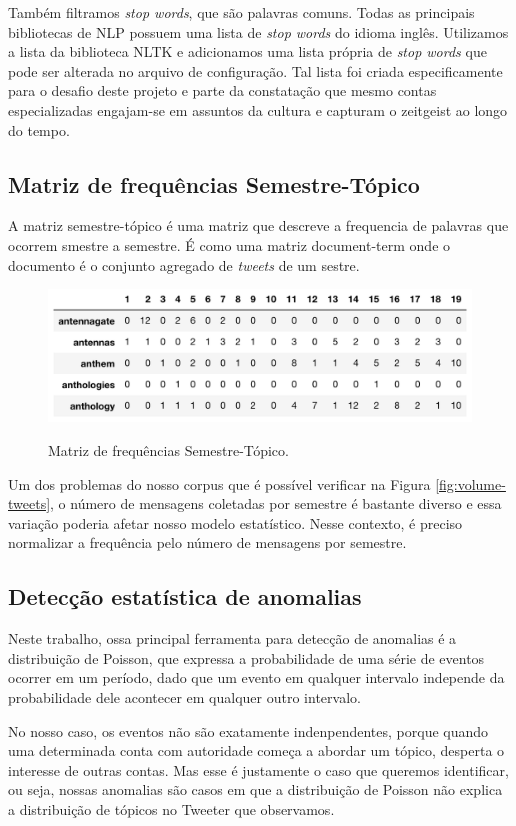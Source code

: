 \documentclass[paper=a4, fontsize=11pt]{scrartcl}
\numberwithin{equation}{section}		%
\numberwithin{figure}{section}			%
\numberwithin{table}{section}				%
\begin{document}
Também filtramos \emph{stop words}, que são palavras comuns. Todas as principais bibliotecas de NLP possuem uma lista de \emph{stop words} do idioma inglês. Utilizamos a lista da biblioteca NLTK \citep{nltk} e adicionamos uma lista própria de \emph{stop words} que pode ser alterada no arquivo de configuração. Tal lista foi criada especificamente para o desafio deste projeto e parte da constatação que mesmo contas especializadas engajam-se em assuntos da cultura e capturam o zeitgeist ao longo do tempo.

\subsection{Matriz de frequências Semestre-Tópico}
A matriz semestre-tópico é uma matriz que descreve a frequencia de palavras que ocorrem smestre a semestre. É como uma matriz document-term onde o documento é o conjunto agregado de \emph{tweets} de um sestre. 
\begin{figure}[h]
	\centering
	\caption{Matriz de frequências Semestre-Tópico.}
	\includegraphics[width=.8\columnwidth]{sem-term}
	\label{fig:sem-term}
\end{figure}
Um dos problemas do nosso corpus que é possível verificar na Figura \ref{fig:volume-tweets}, o número de mensagens coletadas por semestre é bastante diverso e essa variação poderia afetar nosso modelo estatístico. Nesse contexto, é preciso normalizar a frequência pelo número de mensagens por semestre.
\subsection{Detecção estatística de anomalias}
Neste trabalho, ossa principal ferramenta para detecção de anomalias é a distribuição de Poisson, que expressa a probabilidade de uma série de eventos ocorrer em um período, dado que um evento em qualquer intervalo independe da probabilidade dele acontecer em qualquer outro intervalo.

No nosso caso, os eventos não são exatamente indenpendentes, porque quando uma determinada conta com autoridade começa a abordar um tópico, desperta o interesse de outras contas. Mas esse é justamente o caso que queremos identificar, ou seja, nossas anomalias são casos em que a distribuição de Poisson não explica a distribuição de tópicos no Tweeter que observamos.
\end{document}
